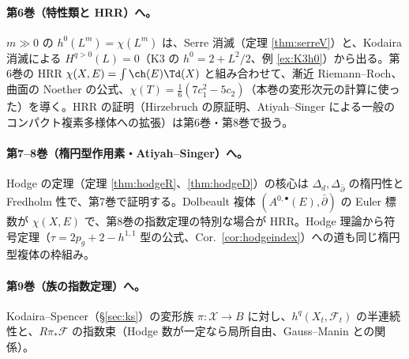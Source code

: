 \paragraph{第6巻（特性類と HRR）へ。}$m\gg0$ の $h^0(L^m)=\chi(L^m)$ は、Serre 消滅（定理 \ref{thm:serreV}）と、Kodaira 消滅による $H^{q>0}(L)=0$（K3 の $h^0=2+L^2/2$、例 \ref{ex:K3h0}）から出る。第6巻の HRR $\chi(X,E)=\int\ch(E)\Td(X)$ と組み合わせて、漸近 Riemann--Roch、曲面の Noether の公式、$\chi(T)=\frac16(7c_1^2-5c_2)$（本巻の変形次元の計算に使った）を導く。HRR の証明（Hirzebruch の原証明、Atiyah--Singer による一般のコンパクト複素多様体への拡張）は第6巻・第8巻で扱う。
\paragraph{第7--8巻（楕円型作用素・Atiyah--Singer）へ。}Hodge の定理（定理 \ref{thm:hodgeR}、\ref{thm:hodgeD}）の核心は $\Delta_d,\Delta_{\bar\partial}$ の楕円性と Fredholm 性で、第7巻で証明する。Dolbeault 複体 $(A^{0,\bullet}(E),\bar\partial)$ の Euler 標数が $\chi(X,E)$ で、第8巻の指数定理の特別な場合が HRR。Hodge 理論から符号定理（$\tau=2p_g+2-h^{1,1}$ 型の公式、Cor.\ \ref{cor:hodgeindex}）への道も同じ楕円型複体の枠組み。
\paragraph{第9巻（族の指数定理）へ。}Kodaira--Spencer（\S\ref{sec:ks}）の変形族 $\pi:\mathcal X\to B$ に対し、$h^q(X_t,\mathcal F_t)$ の半連続性と、$R\pi_*\mathcal F$ の指数束（Hodge 数が一定なら局所自由、Gauss--Manin との関係）。
